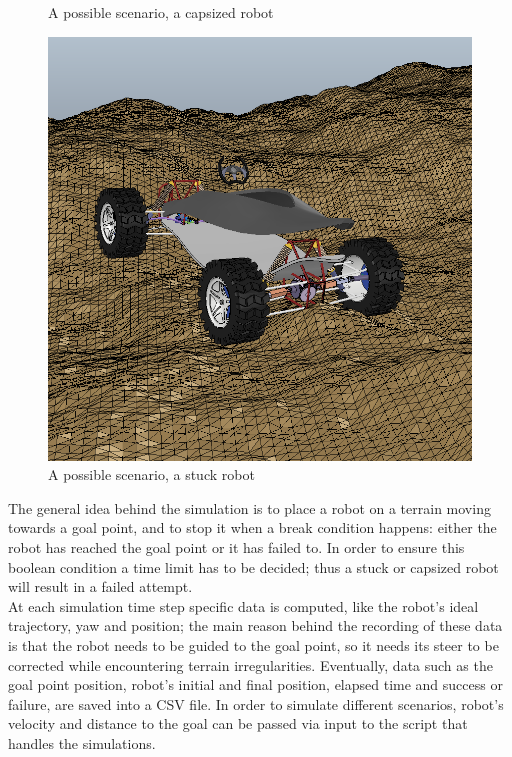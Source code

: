 \documentclass[]{usiinfbachelorproject}
\begin{document}
\begin{figure}[h]
    \caption{A possible scenario, a capsized robot}\label{fig:capsized}
\endminipage\hfill
{}
  \includegraphics[width=\linewidth]{stuck}
    \caption{A possible scenario, a stuck robot}\label{fig:stuck}
\endminipage\hfill
\end{figure}
\noindent
The general idea behind the simulation is to place a robot on a terrain moving towards a goal point, and to stop it when a break condition happens: either the robot has
reached the goal point or it has failed to. In order to ensure this boolean condition a time limit has to be decided; thus a stuck or capsized robot will
result in a failed attempt. \\
At each simulation time step specific data is computed, like the robot's ideal trajectory, yaw and position; the main reason behind the recording of these data
is that the robot needs to be guided to the goal point, so it needs its steer to be corrected while encountering terrain irregularities.
Eventually, data such as the goal point position, robot's initial and final position, elapsed time and success or failure, are saved into a CSV file. In order to simulate different
scenarios, robot's velocity and distance to the goal can be passed via input to the script that handles the simulations.
\end{document}
